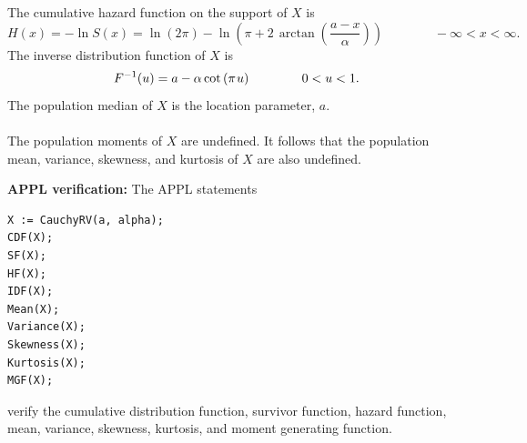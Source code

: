 \documentclass[12pt,fullpage]{article}
\begin{document}
The cumulative hazard function on the support of $X$ is
$$
H(x) = - \ln S(x) = \ln  \left( 2 \pi \right) - \ln  \left( \pi  + 2 \, \arctan \left( {\frac {a - x} {\alpha }} \right)  \right)  \qquad \qquad -\infty < x < \infty.
$$
The inverse distribution function of $X$ is
$$
F ^ {-1}(u) = a - \alpha \cot \left( \pi \kern 0.08 em u \right) \qquad \qquad 0 < u < 1.
$$
The population median of $X$ is the location parameter, $a$.\\
\\
\noindent
The population moments of $X$ are undefined. It follows that the population mean, variance, skewness, and kurtosis of $X$ are also undefined.

\vspace{0.1in}
\noindent
{\bf APPL verification:}
The APPL statements
\begin{verbatim}
X := CauchyRV(a, alpha);
CDF(X);
SF(X);
HF(X);
IDF(X);
Mean(X);
Variance(X);
Skewness(X);
Kurtosis(X);
MGF(X);
\end{verbatim}
verify the cumulative distribution function, survivor function, hazard function, mean, variance, skewness, kurtosis, and moment generating function.
\end{document}
